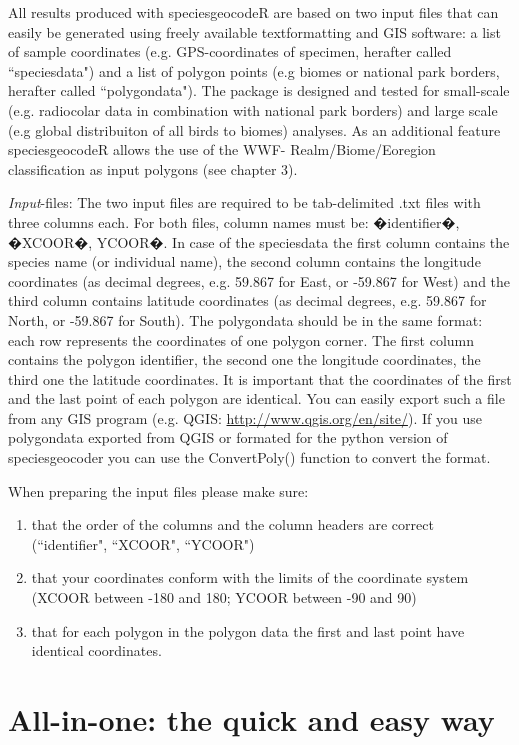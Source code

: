 \documentclass[a4paper,titlepage,11pt]{scrreprt}
\begin{document}
All results produced with speciesgeocodeR are based on two input files that can easily be generated using freely available textformatting and GIS software: a list of sample coordinates (e.g. GPS-coordinates of specimen, herafter called ``speciesdata") and a list of polygon points (e.g biomes or national park borders, herafter called ``polygondata"). The package is designed and tested for small-scale (e.g. radiocolar data in combination with national park borders) and large scale (e.g global distribuiton of all birds to biomes) analyses. As an additional feature speciesgeocodeR allows the use of the WWF- Realm/Biome/Eoregion classification as input polygons (see chapter 3).

\textit{Input}-files: The two input files are required to be tab-delimited .txt files with three columns each. For both files, column names must be: �identifier�, �XCOOR�, YCOOR�. In case of the speciesdata the first column contains the species name (or individual name), the second column contains the longitude coordinates (as decimal degrees, e.g. 59.867 for East, or -59.867 for West) and the third column contains latitude coordinates (as decimal degrees, e.g. 59.867 for North, or -59.867 for South). The polygondata should be in the same format: each row represents the coordinates of one polygon corner. The first column contains the polygon identifier, the second one the longitude coordinates, the third one the latitude coordinates. It is important that the coordinates of the first and the last point of each polygon are identical. You can easily export such a file from any GIS program (e.g. QGIS: \url{http://www.qgis.org/en/site/}). If you use  polygondata exported from QGIS or formated for the python version of speciesgeocoder you can use the ConvertPoly() function to convert the format.

When preparing the input files please make sure:
\begin{enumerate}
\item that the order of the columns and the column headers are correct (``identifier", ``XCOOR", ``YCOOR")
\item that your coordinates conform with the limits of the coordinate system (XCOOR between -180 and 180; YCOOR between -90 and 90)
\item that for each polygon in the polygon data the first and last point have identical coordinates.
\end{enumerate}

\chapter{All-in-one: the quick and easy way}
\end{document}

